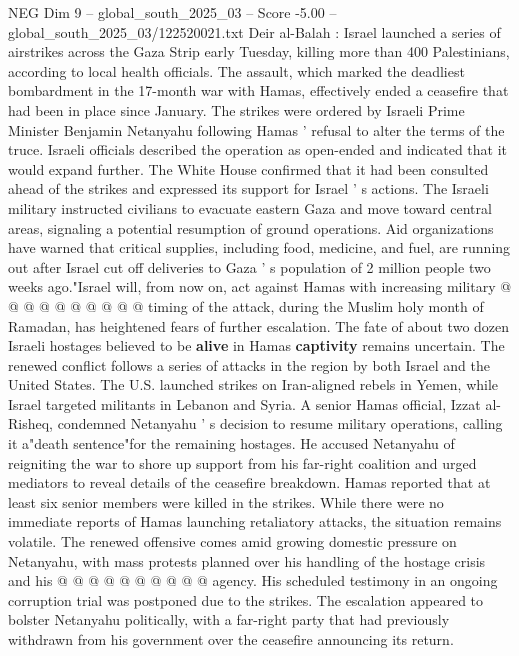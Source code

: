 \begin{textsample}{NEG Dim 9 – global\_south\_2025\_03 – Score -5.00 – global\_south\_2025\_03/122520021.txt}  \label{ex:f9_neg_392}
Deir al-Balah : Israel launched a series of airstrikes across the Gaza Strip early Tuesday, killing more than 400 Palestinians, according to local health officials.
The assault, which marked the deadliest bombardment in the 17-month war with Hamas, effectively ended a ceasefire that had been in place since January.
The strikes were ordered by Israeli Prime Minister Benjamin Netanyahu following Hamas ' refusal to alter the terms of the truce.
Israeli officials described the operation as open-ended and indicated that it would expand further.
The White House confirmed that it had been consulted ahead of the strikes and expressed its support for Israel ' s actions.
The Israeli military instructed civilians to evacuate eastern Gaza and move toward central areas, signaling a potential resumption of ground operations.
Aid organizations have warned that critical supplies, including food, medicine, and fuel, are running out after Israel cut off deliveries to Gaza ' s population of 2 million people two weeks ago."Israel will, from now on, act against Hamas with increasing military @ @ @ @ @ @ @ @ @ @ timing of the attack, during the Muslim holy month of Ramadan, has heightened fears of further escalation.
The fate of about two dozen Israeli hostages believed to be \textbf{alive} in Hamas \textbf{captivity} remains uncertain.
The renewed conflict follows a series of attacks in the region by both Israel and the United States.
The U.S. launched strikes on Iran-aligned rebels in Yemen, while Israel targeted militants in Lebanon and Syria.
A senior Hamas official, Izzat al-Risheq, condemned Netanyahu ' s decision to resume military operations, calling it a"death sentence"for the remaining hostages.
He accused Netanyahu of reigniting the war to shore up support from his far-right coalition and urged mediators to reveal details of the ceasefire breakdown.
Hamas reported that at least six senior members were killed in the strikes.
While there were no immediate reports of Hamas launching retaliatory attacks, the situation remains volatile.
The renewed offensive comes amid growing domestic pressure on Netanyahu, with mass protests planned over his handling of the hostage crisis and his @ @ @ @ @ @ @ @ @ @ agency.
His scheduled testimony in an ongoing corruption trial was postponed due to the strikes.
The escalation appeared to bolster Netanyahu politically, with a far-right party that had previously withdrawn from his government over the ceasefire announcing its return.

\end{textsample}
